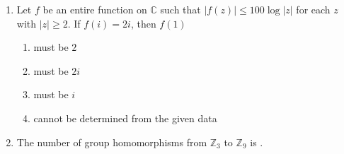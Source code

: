 \documentclass[journal]{IEEEtran}
\begin{document}
\begin{enumerate}
\item  Let  $f$  be an entire function on $ \mathbb{C} $ such that $ |f(z)| \leq 100 \log |z| $ for each $ z $ with $ |z| \geq 2 $. If $ f(i) = 2i $, then $ f(1) $
\begin{multicols}{2}
\begin{enumerate}
    \item must be $2$ 
    \item must be $2i$
    \item must be $i$ 
    \item cannot be determined from the given data
\end{enumerate}
\end{multicols}
\item The number of group homomorphisms from $ \mathbb{Z}_{3} $ to $ \mathbb{Z}_{9} $ is \underline{\hspace{2cm}}.
\end{enumerate}
\end{document}
